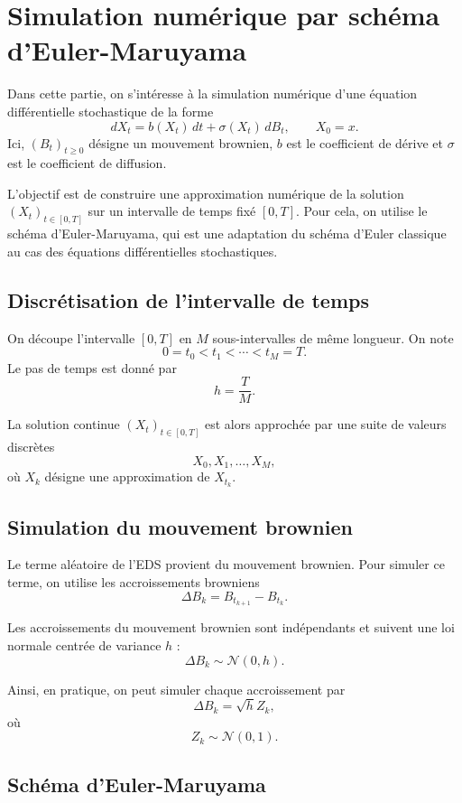 \documentclass[12pt,a4paper]{article}
\theoremstyle{remark}
\begin{document}
\section{Simulation numérique par schéma d’Euler-Maruyama}

Dans cette partie, on s’intéresse à la simulation numérique d’une équation différentielle stochastique de la forme
\[
dX_t = b(X_t)\,dt + \sigma(X_t)\,dB_t, \qquad X_0=x.
\]
Ici, $(B_t)_{t\geq 0}$ désigne un mouvement brownien, $b$ est le coefficient de dérive et $\sigma$ est le coefficient de diffusion.

L’objectif est de construire une approximation numérique de la solution $(X_t)_{t\in[0,T]}$ sur un intervalle de temps fixé $[0,T]$. Pour cela, on utilise le schéma d’Euler-Maruyama, qui est une adaptation du schéma d’Euler classique au cas des équations différentielles stochastiques.

\subsection{Discrétisation de l’intervalle de temps}

On découpe l’intervalle $[0,T]$ en $M$ sous-intervalles de même longueur. On note
\[
0=t_0<t_1<\cdots<t_M=T.
\]
Le pas de temps est donné par
\[
h=\frac{T}{M}.
\]

La solution continue $(X_t)_{t\in[0,T]}$ est alors approchée par une suite de valeurs discrètes
\[
X_0, X_1, \ldots, X_M,
\]
où $X_k$ désigne une approximation de $X_{t_k}$.

\subsection{Simulation du mouvement brownien}

Le terme aléatoire de l’EDS provient du mouvement brownien. Pour simuler ce terme, on utilise les accroissements browniens
\[
\Delta B_k = B_{t_{k+1}} - B_{t_k}.
\]

Les accroissements du mouvement brownien sont indépendants et suivent une loi normale centrée de variance $h$ :
\[
\Delta B_k \sim \mathcal{N}(0,h).
\]

Ainsi, en pratique, on peut simuler chaque accroissement par
\[
\Delta B_k = \sqrt{h}Z_k,
\]
où
\[
Z_k \sim \mathcal{N}(0,1).
\]

\subsection{Schéma d’Euler-Maruyama}
\end{document}
